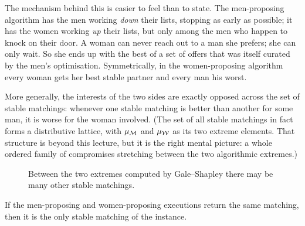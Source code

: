\begin{intuition}
The mechanism behind this is easier to feel than to state. The men-proposing
algorithm has the men working \emph{down} their lists, stopping as early as
possible; it has the women working \emph{up} their lists, but only among the
men who happen to knock on their door. A woman can never reach out to a man
she prefers; she can only wait. So she ends up with the best of a set of
offers that was itself curated by the men's optimisation. Symmetrically, in
the women-proposing algorithm every woman gets her best stable partner and
every man his worst.

More generally, the interests of the two sides are exactly opposed across the
set of stable matchings: whenever one stable matching is better than another
for some man, it is worse for the woman involved. (The set of all stable
matchings in fact forms a distributive lattice, with $\mu_{\mathcal{M}}$ and
$\mu_{\mathcal{W}}$ as its two extreme elements. That structure is beyond this
lecture, but it is the right mental picture: a whole ordered family of
compromises stretching between the two algorithmic extremes.)
\end{intuition}

\begin{figure}[ht]
\centering
{}
\caption{Between the two extremes computed by Gale--Shapley there may be many
other stable matchings.}
\label{fig:sm-lattice}
\end{figure}

\begin{corollary}\label{cor:sm-unique}
If the men-proposing and women-proposing executions return the same matching,
then it is the only stable matching of the instance.
\end{corollary}

